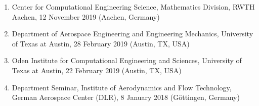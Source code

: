 \documentclass{resume} %
\begin{document}
\begin{enumerate}
    \item Center for Computational Engineering Science, Mathematics Division, RWTH Aachen, 12 November 2019 (Aachen, Germany)
    \item Department of Aerospace Engineering and Engineering Mechanics, University of Texas at Austin, 28 February 2019 (Austin, TX, USA)
    \item Oden Institute for Computational Engineering and Sciences, University of Texas at Austin, 22 February 2019 (Austin, TX, USA)
    \item Department Seminar, Institute of Aerodynamics and Flow Technology, German Aerospace Center (DLR), 8 January 2018 (G\"{o}ttingen, Germany)
\end{enumerate}



\end{document}
